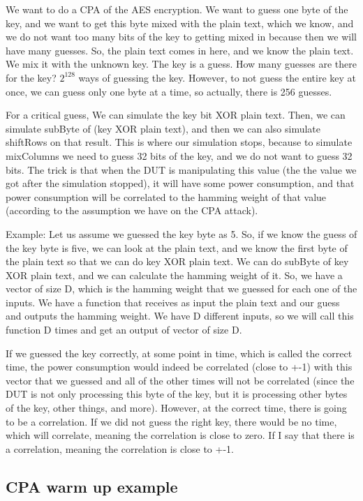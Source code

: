 We want to do a CPA of the AES encryption. We want to guess one byte of the key, and we want to get this byte mixed with the plain text, which we know, and we
do not want too many bits of the key to getting mixed in because then we will have many guesses. So, the plain text comes in here, and we know the plain text. We
mix it with the unknown key. The key is a guess. How many guesses are there for
the key?  $2^{128}$ ways of guessing the key. However, to not guess the
entire key at once, we can guess only one byte at a time, so actually, there is
256 guesses. 

For a critical guess, We can simulate the key bit XOR plain text. Then, we can
simulate subByte of (key XOR plain text), and then we can also simulate
shiftRows on that result. This is where our simulation stops, because to
simulate mixColumns we need to guess 32 bits of the key, and we do not want to
guess 32 bits. The trick is that when the DUT is manipulating this value (the
the value we got after the simulation stopped), it will have some power consumption,
and that power consumption will be correlated to the hamming weight of that
value (according to the assumption we have on the CPA attack). 

Example: Let us assume we guessed the key byte as 5. So, if we know the guess of
the key byte is five, we can look at the plain text, and we know the first byte of
the plain text so that we can do key XOR plain text. We can do subByte of key XOR
plain text, and we can calculate the hamming weight of it. So, we have a vector
of size D, which is the hamming weight that we guessed for each one of the
inputs. We have a function that receives as input the plain text and our guess
and outputs the hamming weight. We have D different inputs, so we will call this
function D times and get an output of vector of size D. 

If we guessed the key correctly, at some point in time, which is called the
correct time, the power consumption would indeed be correlated (close to +-1)
with this vector that we guessed and all of the other times will not be
correlated (since the DUT is not only processing this byte of the key, but it is
processing other bytes of the key, other things, and more). However, at the correct
time, there is going to be a correlation. If we did not guess the right key,
there would be no time, which will correlate, meaning the correlation is
close to zero. If I say that there is a correlation, meaning the correlation is
close to +-1. 

\subsection{CPA warm up example}\label{c8_CPA_warm_up_example:subsec}

